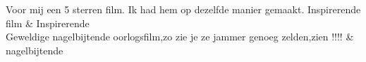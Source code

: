 \begin{table}
\begin{tabu}
Voor mij een 5 sterren film. Ik had hem op dezelfde manier gemaakt. Inspirerende film                                                                                                                                                                                                                                                                                                                                                                                                                                                                                                                                                                                                                                                                                                                                                                                                                                                                                                                                                                                                                                                                                                                                                                                                                                                                                                                                                                                                           & Inspirerende                         \\ \hline
Geweldige nagelbijtende oorlogsfilm,zo zie je ze jammer genoeg zelden,zien !!!!                                                                                                                                                                                                                                                                                                                                                                                                                                                                                                                                                                                                                                                                                                                                                                                                                                                                                                                                                                                                                                                                                                                                                                                                                                                                                                                                                                                                                 & nagelbijtende                        \\ \hline

\end{tabu}
\end{table}
